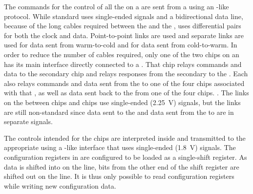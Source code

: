 The commands for the control of all the  on a  are sent 
from a   
using an -like~\cite{bib:I2C} protocol. While standard 
 uses single-ended  signals and a bidirectional data 
line, because of the long cables required between the  and the 
,  uses  differential pairs for both 
the  clock and data. Point-to-point links are used and separate 
links are used for data sent from warm-to-cold and for data sent from cold-to-warm.  
In order to reduce the number of cables required, only one of the two 
 chips on an  has its main  interface 
directly connected to a . That  chip relays  
commands and data to the secondary  chip and relays  
responses from the secondary  to the . Each 
 also relays  commands and data sent from the 
 to one of the four  chips associated with that 
, as well as data sent back to the  from one of the 
four  chips. 
. 
The links on the  between  
chips and  chips use single-ended (\SI{2.25}{V})  
signals, but the  links are still non-standard since  %
data sent to the  and data sent from the 
 to  are in separate signals. 

The controls intended for the   chips are interpreted 
inside  and transmitted to the appropriate  using 
a -like interface that uses single-ended (\SI{1.8}{V})  
signals. The configuration registers in  are configured to be 
loaded as a single-shift register. As data is shifted into  on 
the  line, bits from the other end of the shift register are shifted 
out on the  line. It is thus only possible to read  
configuration registers while writing new configuration data.

